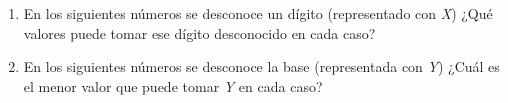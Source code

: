 \documentclass[12pt]{article}
\begin{document}
\begin{enumerate}

    \item En los siguientes números se desconoce un dígito (representado con
        \emph{X}) ¿Qué valores puede tomar ese dígito desconocido en cada caso?


    \item En los siguientes números se desconoce la base (representada con
        \emph{Y}) ¿Cuál es el menor valor que puede tomar \emph{Y} en cada
        caso?


\end{enumerate}
\end{document}
